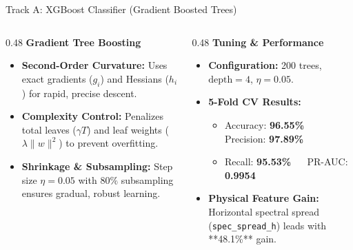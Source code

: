 \documentclass[aspectratio=169,11pt]{beamer}
\begin{document}
\begin{frame}{Track A: XGBoost Classifier (Gradient Boosted Trees)}
  \vspace*{0.12cm}
  \begin{columns}[T,onlytextwidth]
    \begin{column}{0.48\textwidth}
      \textbf{\small\color{navy} Gradient Tree Boosting}
      \vspace*{0.08cm}
      \begin{itemize}\setlength{\itemsep}{0.25em}\footnotesize
        \item \textbf{Second-Order Curvature:} Uses exact gradients ($g_i$) and Hessians ($h_i$) for rapid, precise descent.
        \item \textbf{Complexity Control:} Penalizes total leaves ($\gamma T$) and leaf weights ($\lambda \|w\|^2$) to prevent overfitting.
        \item \textbf{Shrinkage \& Subsampling:} Step size $\eta = 0.05$ with $80\%$ subsampling ensures gradual, robust learning.
      \end{itemize}
    \end{column}
    \hfill
    \begin{column}{0.48\textwidth}
      \textbf{\small\color{blastred} Tuning \& Performance}
      \vspace*{0.08cm}
      \begin{itemize}\setlength{\itemsep}{0.25em}\footnotesize
        \item \textbf{Configuration:} 200 trees, $\text{depth} = 4$, $\eta = 0.05$.
        \item \textbf{5-Fold CV Results:}
          \begin{itemize}\scriptsize
            \item Accuracy: \textbf{96.55\%} $\quad$ Precision: \textbf{97.89\%}
            \item Recall: \textbf{95.53\%} $\quad$ PR-AUC: \textbf{0.9954}
          \end{itemize}
        \item \textbf{Physical Feature Gain:} Horizontal spectral spread (\texttt{spec\_spread\_h}) leads with **48.1\%** gain.
      \end{itemize}
    \end{column}
  \end{columns}
\end{frame}
\end{document}
